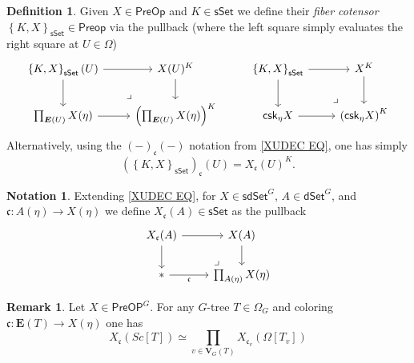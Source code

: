 \documentclass[a4paper,10pt
,draft
]{article}%
\numberwithin{equation}{section}
\numberwithin{figure}{section}
\theoremstyle{definition} %
\newtheorem{definition}[equation]{Definition}%
\newtheorem{remark}[equation]{Remark}%
\newtheorem{notation}[equation]{Notation}%
\newcommand{\1}{\ensuremath{\mathbbm 1}}%
\begin{document}
\begin{definition}
	Given $X \in \mathsf{PreOp}$ 
	and $K \in \mathsf{sSet}$
	we define their
	\emph{fiber cotensor}
	$\left\{ K, X \right\}_{\mathsf{sSet}} \in \mathsf{Preop}$
	via the pullback
	(where the left square simply evaluates the right square
	at $U \in \Omega$)
\begin{equation}
\begin{tikzcd}
	\left\{ K, X \right\}_{\mathsf{sSet}} (U) \ar{r} \ar{d}
&
	X(U)^K \ar{d}
&%
	\left\{ K, X \right\}_{\mathsf{sSet}} \ar{r} \ar{d}
&
	X^K \ar{d}
\\
	\prod_{\boldsymbol{E}(U)} X(\eta) \ar{r}
&
	\left(\prod_{\boldsymbol{E}(U)} X(\eta)\right)^K
	\arrow[lu, phantom, "\lrcorner", very near start]
&%
	\mathsf{csk}_{\eta} X  \ar{r}
&
	\left(\mathsf{csk}_{\eta} X\right)^K
	\arrow[lu, phantom, "\lrcorner", very near start]
\end{tikzcd}
\end{equation}
Alternatively, using the $(-)_{\mathfrak{c}}(-)$ notation from 
\eqref{XUDEC EQ}, one has simply
\begin{equation}\label{EASYCOTEN EQ}
\left(\left\{ K, X \right\}_{\mathsf{sSet}}\right)_{\mathfrak{c}} (U)
=
X_{\mathfrak{c}}(U)^K.
\end{equation}
\end{definition}



\begin{notation}
	Extending \eqref{XUDEC EQ},
	for $X \in \mathsf{sdSet}^G$, 
	$A \in \mathsf{dSet}^G$,
	and $\mathfrak{c} \colon A(\eta) \to X(\eta)$ 
	we define $X_{\mathfrak{c}}(A)\in \mathsf{sSet}$
	as the pullback	
\begin{equation}\label{XUDECALT EQ}
\begin{tikzcd}
	X_{\mathfrak{c}}(A) \ar{r} \ar{d}
&
	X(A) \ar{d}
\\
	\** \ar{r}[swap]{\mathfrak{c}} 
&
	\prod_{A(\eta)} X(\eta)
	\arrow[lu, phantom, "\lrcorner", very near start]
\end{tikzcd}
\end{equation}
\end{notation}



\begin{remark}

Let $X \in \mathsf{PreOP}^G$.
For any $G$-tree $T \in \Omega_G$
and coloring 
$\mathfrak{c} \colon \boldsymbol{E}(T) \to X(\eta)$
one has
\[
X_{\mathfrak{c}}(Sc[T]) 
\simeq
\prod_{v \in \boldsymbol{V}_G(T)}
X_{\mathfrak{c}_v}(\Omega[T_v]) 
\]
\end{remark}
\end{document}
